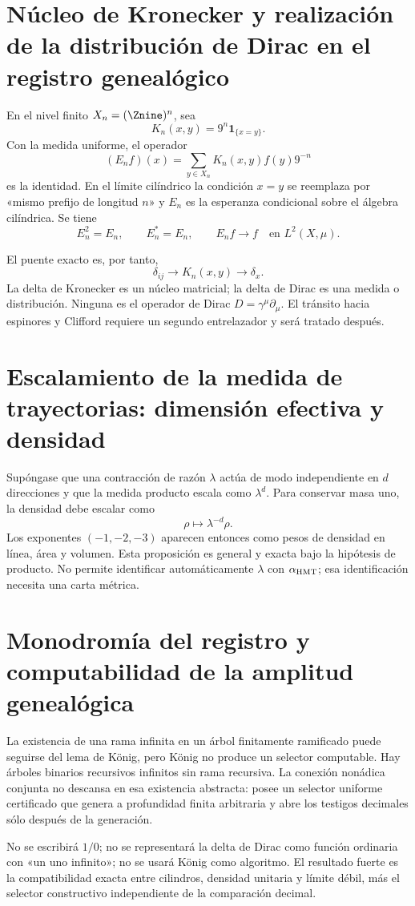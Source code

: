 \section{Núcleo de Kronecker y realización de la distribución de Dirac en el registro genealógico}

En el nivel finito \(X_n=(\Znine)^n\), sea
\[
K_n(x,y)=9^n\mathbf1_{\{x=y\}}.
\]
Con la medida uniforme, el operador
\[
(E_nf)(x)=\sum_{y\in X_n}K_n(x,y)f(y)9^{-n}
\]
es la identidad. En el límite cilíndrico la condición \(x=y\) se reemplaza por
«mismo prefijo de longitud \(n\)» y \(E_n\) es la esperanza condicional sobre
el álgebra cilíndrica. Se tiene
\[
E_n^2=E_n,\qquad E_n^*=E_n,\qquad E_nf\to f
\quad\text{en }L^2(X,\mu).
\]

El puente exacto es, por tanto,
\[
\delta_{ij}
\longrightarrow K_n(x,y)
\longrightarrow\delta_x.
\]
La delta de Kronecker es un núcleo matricial; la delta de Dirac es una medida o
distribución. Ninguna es el operador de Dirac
\(D=\gamma^\mu\partial_\mu\). El tránsito hacia espinores y Clifford requiere
un segundo entrelazador y será tratado después.

\section{Escalamiento de la medida de trayectorias: dimensión efectiva y densidad}

Supóngase que una contracción de razón \(\lambda\) actúa de modo independiente
en \(d\) direcciones y que la medida producto escala como \(\lambda^d\). Para
conservar masa uno, la densidad debe escalar como
\[
\rho\longmapsto\lambda^{-d}\rho.
\]
Los exponentes \((-1,-2,-3)\) aparecen entonces como pesos de densidad en línea,
área y volumen. Esta proposición es general y exacta bajo la hipótesis de
producto. No permite identificar automáticamente \(\lambda\) con
\(\alpha_{\rm HMT}\); esa identificación necesita una carta métrica.

\section{Monodromía del registro y computabilidad de la amplitud genealógica}

La existencia de una rama infinita en un árbol finitamente ramificado puede
seguirse del lema de König, pero König no produce un selector computable. Hay
árboles binarios recursivos infinitos sin rama recursiva. La conexión nonádica
conjunta no descansa en esa existencia abstracta: posee un selector uniforme
certificado que genera a profundidad finita arbitraria y abre los testigos
decimales sólo después de la generación.

\begin{falsadorBox}[title={Tres confusiones prohibidas}]
No se escribirá \(1/0\); no se representará la delta de Dirac como función
ordinaria con «un uno infinito»; no se usará König como algoritmo. El resultado
fuerte es la compatibilidad exacta entre cilindros, densidad unitaria y límite
débil, más el selector constructivo independiente de la comparación decimal.
\end{falsadorBox}
